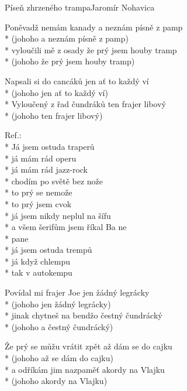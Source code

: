 \documentclass[10.5pt]{book}
\begin{document}
\begin{poem}{Píseň zhrzeného trampa}{Jaromír Nohavica}

\settowidth{\versewidth}{Že prý se můžu vrátit zpět až dám se do cajku}

\begin{altverse}
Poněvadž nemám kanady
a neznám písně z pamp\\*
(johoho a neznám písně z pamp)\\*
vyloučili mě z osady
že prý jsem houby tramp\\*
(johoho že prý jsem houby tramp)
\end{altverse}

\begin{altverse}
Napsali si do cancáků
jen ať to každý ví\\*
(johoho jen ať to každý ví)\\*
Vyloučený z řad čundráků
ten frajer libový\\*
(johoho ten frajer libový)
\end{altverse}

Ref.:\\*
Já jsem ostuda traperů\\*
já mám rád operu\\*
já mám rád jazz-rock\\*
chodím po světě bez nože\\*
to prý se nemože\\*
to prý jsem cvok\\*
já jsem nikdy neplul na šífu\\*
a všem šerifům jsem říkal Ba ne\\*
pane\\*
já jsem ostuda trempů\\*
já když chlempu\\*
tak v autokempu

\begin{altverse}
Povídal mi frajer Joe
jen žádný legrácky\\*
(johoho jen žádný legrácky)\\*
jinak chytneš na bendžo
čestný čundrácký\\*
(johoho a čestný čundrácký)
\end{altverse}

\begin{altverse}
Že prý se můžu vrátit zpět
až dám se do cajku\\*
(johoho až se dám do cajku)\\*
a odříkám jim nazpaměť
akordy na Vlajku\\*
(johoho akordy na Vlajku)
\end{altverse}


\end{poem}
\end{document}
